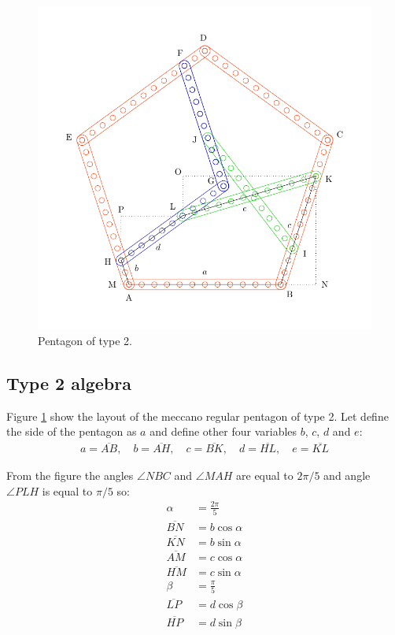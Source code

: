 \documentclass[11pt]{article}
\begin{document}
\begin{figure}[H] %
\centering
\includegraphics[scale=0.75]{types/2}
\caption{Pentagon of type 2.}
\label{fig:type-2}
\end{figure}

\subsection{Type 2 algebra}

Figure \ref{fig:type-2} show the layout of the meccano regular pentagon of type 2.
Let define the side of the pentagon as $a$ and define other four variables $b$, $c$, $d$ and $e$:
\begin{align*}
a = \overline{AB},\quad
b = \overline{AH},\quad
c = \overline{BK},\quad
d = \overline{HL},\quad
e = \overline{KL}
\end{align*}


From the figure the angles $\angle{NBC}$ and $\angle{MAH}$ are equal to $2\pi / 5$ and
angle $\angle{PLH}$ is equal to $\pi / 5$ so:
\begin{align*}
\alpha &= \frac{2\pi}{5}\\
\overline{BN} &= b\cos{\alpha}\\
\overline{KN} &= b\sin{\alpha}\\
\overline{AM} &= c\cos{\alpha}\\
\overline{HM} &= c\sin{\alpha}\\
\beta &= \frac{\pi}{5}\\
\overline{LP} &= d\cos{\beta}\\
\overline{HP} &= d\sin{\beta}
\end{align*}
\end{document}
